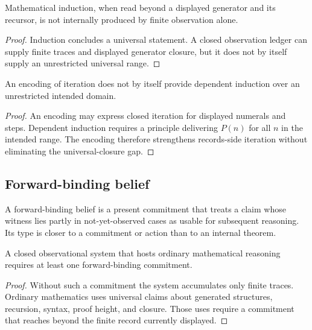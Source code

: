 \begin{corollary}
\label{cor:philosophy-induction-not-produced-by-observation}
Mathematical induction, when read beyond a displayed generator and its
recursor, is not internally produced by finite observation alone.
\end{corollary}
\begin{proof}
Induction concludes a universal statement. A closed observation ledger
can supply finite traces and displayed generator closure, but it does
not by itself supply an unrestricted universal range.
\end{proof}

\begin{corollary}
\label{cor:philosophy-church-encoding-does-not-erase-gap}
An encoding of iteration does not by itself provide dependent
induction over an unrestricted intended domain.
\end{corollary}
\begin{proof}
An encoding may express closed iteration for displayed numerals and
steps. Dependent induction requires a principle delivering \(P(n)\) for
all \(n\) in the intended range. The encoding therefore strengthens
records-side iteration without eliminating the universal-closure gap.
\end{proof}

\subsection{Forward-binding belief}
\label{subsec:philosophy-forward-binding-belief}

\begin{definition}
\label{def:philosophy-forward-binding-belief}
A forward-binding belief is a present commitment that treats a claim
whose witness lies partly in not-yet-observed cases as usable for
subsequent reasoning. Its type is closer to a commitment or action than
to an internal theorem.
\end{definition}

\begin{theorem}
\label{thm:philosophy-mathematics-needs-forward-binding}
A closed observational system that hosts ordinary mathematical
reasoning requires at least one forward-binding commitment.
\end{theorem}
\begin{proof}
Without such a commitment the system accumulates only finite traces.
Ordinary mathematics uses universal claims about generated structures,
recursion, syntax, proof height, and closure. Those uses require a
commitment that reaches beyond the finite record currently displayed.
\end{proof}


